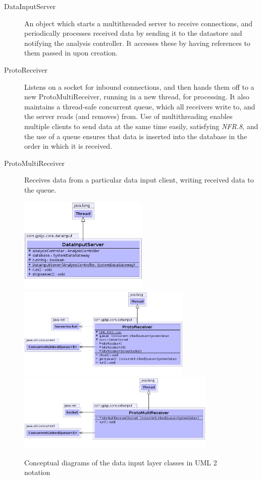 \documentclass[10pt,a4paper]{article}
\newcommand{\nfrit}[1]{\textit{NFR.#1}}
\begin{document}
\begin{description}
  \item[DataInputServer] An object which starts a multithreaded
    server to receive connections, and periodically processes
    received data by sending it to the datastore and notifying the
    analysis controller. It accesses these by having references to them
    passed in upon creation.

  \item[ProtoReceiver] Listens on a socket for inbound connections,
    and then hands them off to a new ProtoMultiReceiver, running in a
    new thread, for processing. It also maintains a thread-safe
    concurrent queue, which all receivers write to, and the
    server reads (and removes) from. Use of multithreading
    enables multiple clients to send data at the same time easily, satisfying \nfrit{8}, and
    the use of a queue ensures that data is inserted into the database
    in the order in which it is received.

  \item[ProtoMultiReceiver] Receives data from a particular data input
    client, writing received data to the queue.
\end{description}

\begin{figure}[ht!]
  \centering
  \includegraphics[width=6.2cm]{images/DataInputLayer/DataInputServer.png}
  \includegraphics[width=8.3cm]{images/DataInputLayer/ProtoReceiver.png}
  \includegraphics[width=9.5cm]{images/DataInputLayer/ProtoMultiReceiver.png}
  \caption{Conceptual diagrams of the data input layer classes in 
UML 2 notation}
  \label{fig:dataInputLayer}
\end{figure}
\end{document}
